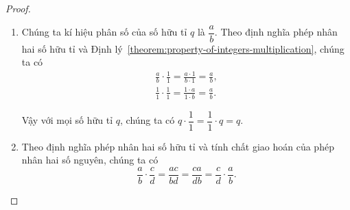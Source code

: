 \begin{proof}
\begin{enumerate}[label={(\roman*)}]
\begin{align*}
                                                                         & \text{(theo tính chất phân phối của phép nhân với phép cộng số nguyên)}                                    \\
                                                                         & = \frac{x(ad)}{y(bd)} + \frac{x(bc)}{y(bd)} \quad \text{(theo Định lý~\ref{theorem:same-denominator})}     \\
                                                                         & = \frac{(xa)d}{(yb)d} + \frac{b(xc)}{b(yd)}                                                                \\
                                                                         & \text{(theo tính chất kết hợp và giao hoán của phép nhân số nguyên)}                                       \\
                                                                         & = \frac{xa}{yb} + \frac{xc}{yd} \quad \text{(theo Định lý~\ref{theorem:fundamental-property-of-fraction})} \\
                                                                         & = \frac{x}{y}\cdot\frac{a}{b} + \frac{x}{y}\cdot\frac{c}{d}.
              \end{align*}

              Vậy phép nhân số hữu tỉ có tính chất phân phối với phép cộng số hữu tỉ.
        \item Chúng ta kí hiệu phân số của số hữu tỉ $q$ là $\dfrac{a}{b}$. Theo định nghĩa phép nhân hai số hữu tỉ và Định lý~\ref{theorem:property-of-integers-multiplication}, chúng ta có
              \begin{align*}
                  \frac{a}{b}\cdot\frac{1}{1} = \frac{a\cdot 1}{b\cdot 1} = \frac{a}{b}, \\
                  \frac{1}{1}\cdot\frac{1}{1} = \frac{1\cdot a}{1\cdot b} = \frac{a}{b}.
              \end{align*}

              Vậy với mọi số hữu tỉ $q$, chúng ta có $q\cdot\dfrac{1}{1} = \dfrac{1}{1}\cdot q = q$.
        \item Theo định nghĩa phép nhân hai số hữu tỉ và tính chất giao hoán của phép nhân hai số nguyên, chúng ta có
              \[
                  \frac{a}{b}\cdot\frac{c}{d} = \frac{ac}{bd} = \frac{ca}{db} = \frac{c}{d}\cdot\frac{a}{b}.
              \]


\end{enumerate}
\end{proof}
